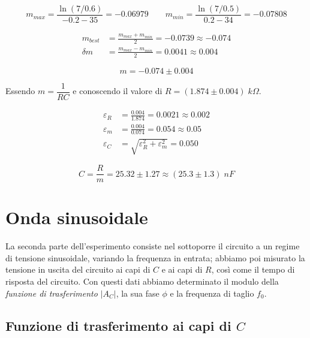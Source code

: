 \documentclass[11pt, a4paper]{article}
\numberwithin{equation}{section} %
\begin{document}
\begin{equation*}
    m_{max} = \frac{\ln(7/0.6)}{- 0.2 - 35} = - 0.06979
    \qquad
    m_{min} = \frac{\ln(7/0.5)}{0.2 - 34} = - 0.07808
\end{equation*}

\begin{align*}
    m_{best} &= \frac{m_{max} + m_{min}}{2} = - 0.0739 \approx - 0.074 \\
    \delta m &= \frac{m_{max} - m_{min}}{2} = 0.0041 \approx 0.004
\end{align*}

\begin{equation}
    m = - 0.074 \pm 0.004
\end{equation}

\newpage

Essendo \(m = \dfrac{1}{RC}\) e conoscendo il valore di \(R = (1.874 \pm 0.004) \; \unit{k\Omega}\).

\begin{align*}
    \varepsilon_R &= \frac{0.004}{1.874} = 0.0021 \approx 0.002 \\
    \varepsilon_m &= \frac{0.004}{0.074} = 0.054 \approx 0.05 \\
    \varepsilon_C &= \sqrt{\varepsilon_R^{2} + \varepsilon_m^{2}} = 0.050 %
\end{align*}

\begin{equation}
    C = \frac{R}{m} = 25.32 \pm 1.27 \approx (25.3 \pm 1.3) \; \unit{nF}
\end{equation}

\section{Onda sinusoidale}

La seconda parte dell'esperimento consiste nel sottoporre il circuito a un regime di tensione sinusoidale, variando la frequenza in entrata; abbiamo poi misurato la tensione in uscita del circuito ai capi di $C$ e ai capi di $R$, così come il tempo di risposta del circuito. Con questi dati abbiamo determinato il modulo della \emph{funzione di trasferimento} $|A_{C}|$, la sua fase $\phi$ e la frequenza di taglio $f_{0}$.

% 

\subsection{Funzione di trasferimento ai capi di $C$}
\end{document}
